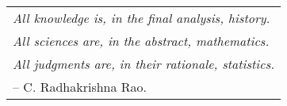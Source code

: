 
\vspace*{0.3\textheight}

\begin{center}\large
\begin{tabular}{l}
\textit{All knowledge is, in the final analysis, history.} \\
\textit{All sciences are, in the abstract, mathematics. }\\
\textit{All judgments are, in their rationale, statistics.}\\
\hspace{4.5cm} -- C. Radhakrishna Rao.
\end{tabular}
\end{center}

\normalfont